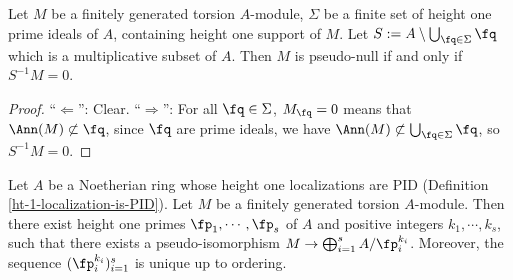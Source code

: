 \begin{lem}
\label{pseudo-null-iff-localization-eq-zero}
\leanok
Let $M$ be a finitely generated torsion $A$-module, $\Sigma$ be a finite set of height one prime ideals of $A$,
containing height one support of $M$.
Let $S:=A\setminus\bigcup_{\fq\in\Sigma}\fq$ which is a multiplicative subset of $A$.
Then $M$ is pseudo-null if and only if $S^{-1}M=0$.
\end{lem}

\begin{proof}
\leanok
``$\Leftarrow$'': Clear.
``$\Rightarrow$'': For all $\fq\in\Sigma$, $M_\fq=0$ means that $\Ann(M)\not\subset\fq$,
since $\fq$ are prime ideals, we have $\Ann(M)\not\subset\bigcup_{\fq\in\Sigma}\fq$,
so $S^{-1}M=0$.
\end{proof}

\begin{prop}
\label{structure-thm}
\leanok
Let $A$ be a Noetherian ring whose height one localizations are PID
(Definition \ref{ht-1-localization-is-PID}).
Let $M$ be a finitely generated torsion $A$-module.
Then there exist height one primes $\fp_1,\cdots,\fp_s$ of $A$
and positive integers $k_1,\cdots,k_s$, such that there exists a pseudo-isomorphism
$M\to\bigoplus_{i=1}^s A/\fp_i^{k_i}$.
Moreover, the sequence $(\fp_i^{k_i})_{i=1}^s$ is unique up to ordering.
\end{prop}

